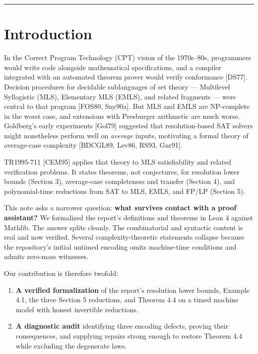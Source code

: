 \documentclass[11pt,a4paper]{article}
\begin{document}
\begin{center}\rule{0.5\linewidth}{0.5pt}\end{center}

\hypertarget{introduction}{%
\section{Introduction}\label{introduction}}

In the Correct Program Technology (CPT) vision of the 1970s--80s, programmers would write code alongside mathematical specifications, and a compiler integrated with an automated theorem prover would verify conformance {[}DS77{]}. Decision procedures for decidable sublanguages of set theory --- Multilevel Syllogistic (MLS), Elementary MLS (EMLS), and related fragments --- were central to that program {[}FOS80, Sny90a{]}. But MLS and EMLS are NP-complete in the worst case, and extensions with Presburger arithmetic are much worse. Goldberg's early experiments {[}Gol79{]} suggested that resolution-based SAT solvers might nonetheless perform well on \emph{average} inputs, motivating a formal theory of average-case complexity {[}BDCGL89, Lev86, RS93, Gur91{]}.

TR1995-711 {[}CEM95{]} applies that theory to MLS satisfiability and related verification problems. It states theorems, not conjectures, for resolution lower bounds (Section 3), average-case completeness and transfer (Section 4), and polynomial-time reductions from SAT to MLS, EMLS, and FP/LP (Section 5).

This note asks a narrower question: \textbf{what survives contact with a proof assistant?} We formalized the report's definitions and theorems in Lean 4 against Mathlib. The answer splits cleanly. The combinatorial and syntactic content is real and now verified. Several complexity-theoretic statements collapse because the repository's initial untimed encoding omits machine-time conditions and admits zero-mass witnesses.

Our contribution is therefore twofold:

\begin{enumerate}
\def\labelenumi{\arabic{enumi}.}
\item
  \textbf{A verified formalization} of the report's resolution lower bounds, Example 4.1, the three Section 5 reductions, and Theorem 4.4 on a timed machine model with honest invertible reductions.
\item
  \textbf{A diagnostic audit} identifying three encoding defects, proving their consequences, and supplying repairs strong enough to restore Theorem 4.4 while excluding the degenerate laws.
\end{enumerate}
\end{document}
